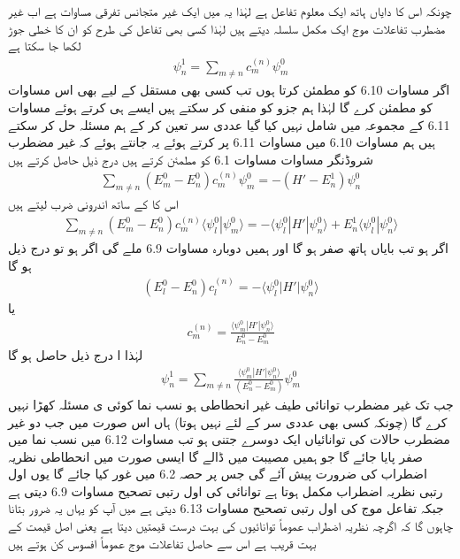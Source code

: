 چونکہ اس کا دایاں ہاتھ ایک معلوم تفاعل ہے لہٰذا یہ  میں ایک غیر  متجانس  تفرقی مساوات ہے اب غیر مضطرب تفاعلات موج ایک مکمل سلسلہ دیتے ہیں  لہٰذا  کسی بھی تفاعل کی طرح  کو ان کا خطی جوڑ لکھا جا سکتا ہے 
\begin{align}
\psi_n^1 = \sum_{m \ne n} c_m^{(n)} \psi_m^0
\end{align}
اگر  مساوات 6.10 کو مطمئن کرتا ہوں تب کسی بھی مستقل  کے لیے  بھی اس مساوات کو مطمئن کرے گا  لہٰذا  ہم جزو  کو منفی کر سکتے ہیں ایسے ہی کرتے ہوئے مساوات 6.11 کے مجموعہ میں  شامل نہیں کیا گیا عددی سر  تعین کر کے ہم مسئلہ حل کر سکتے ہیں ہم مساوات 6.10 میں مساوات 6.11 پر کرتے ہوئے یہ جانتے ہوئے کہ غیر مضطرب شروڈنگر  مساوات مساوات 6.1 کو  مطمئن کرتے ہیں درج ذیل حاصل کرتے ہیں 
\begin{align*}
\sum_{m \ne n} {(E_m^0 - E_n^0) c_m^{(n)} \psi_m^0} = - {(H' - E_n^1) \psi_n^0}
\end{align*}
اس کا  کے ساتھ اندرونی ضرب لیتے ہیں 
\begin{align*}
\sum_{m \ne n} (E_m^0 - E_n^0) c_m^{(n)} \langle \psi_l^0 | \psi_m^0 \rangle = - \langle \psi_l^0 | H' | \psi_n^0 \rangle + E_n^1 \langle \psi_l^0 | \psi_n^0 \rangle 
\end{align*}
اگر  ہو تب بایاں ہاتھ صفر ہو گا اور ہمیں دوبارہ مساوات 6.9 ملے گی اگر  ہو تو درج ذیل ہو گا 
\begin{align*}
(E_l^0 - E_n^0) c_l^{(n)} = - \langle \psi_l^0 | H' | \psi_n^0 \rangle
\end{align*}
یا 
\begin{align}
c_m^{(n)} = \frac{\langle \psi_m^0 | H' | \psi_n^0 \rangle}{E_n^0 - E_m^0}
\end{align}
 لہٰذا ا درج ذیل حاصل ہو گا 
\begin{align}
\psi_n^1 = \sum_{m \ne n} \frac{\langle \psi_m^0 | H' | \psi_n^0 \rangle}{(E_n^0 - E_m^0)} \psi_m^0
\end{align}
جب تک غیر مضطرب توانائی طیف غیر انحطاطی ہو  نسب نما  کوئی ی مسئلہ کھڑا نہیں کرے گا  (چونکہ کسی بھی عددی سر کے لئے   نہیں ہوتا) ہاں اس صورت میں جب دو غیر مضطرب حالات کی توانائیاں ایک دوسرے جتنی ہو تب مساوات 6.12 میں نسب نما میں صفر پایا جائے گا جو ہمیں مصیبت میں ڈالے گا ایسی صورت میں انحطاطی نظریہ اضطراب کی ضرورت پیش آئے گی جس پر حصہ 6.2 میں غور کیا جائے گا یوں اول رتبی  نظریہ اضطراب مکمل ہوتا ہے توانائی کی اول رتبی تصحیح  مساوات 6.9 دیتی ہے جبکہ تفاعل موج کی اول رتبی  تصحیح  مساوات 6.13 دیتی ہے میں آپ کو یہاں یہ ضرور بتانا چاہوں گا کہ اگرچہ نظریہ اضطراب عموماً  توانائیوں کی بہت درست قیمتیں دیتا ہے یعنی  اصل قیمت  کے بہت قریب ہے اس سے حاصل تفاعلات موج عموماً   افسوس  کن  ہوتے ہیں  

